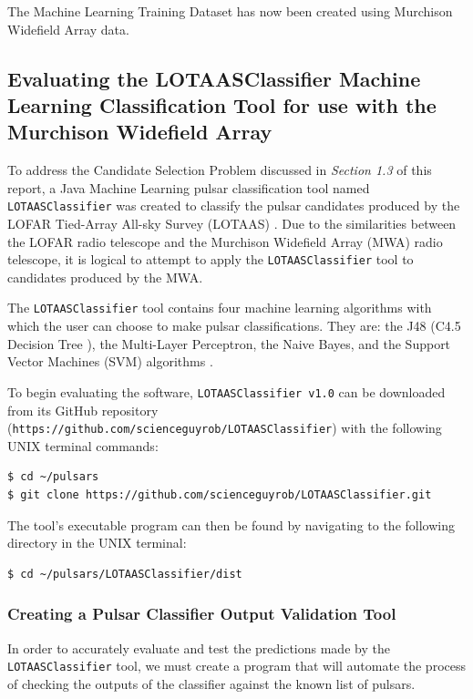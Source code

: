 \documentclass{article}
\begin{document}
The Machine Learning Training Dataset has now been created using Murchison Widefield Array data.
    
\subsection{Evaluating the LOTAASClassifier Machine Learning Classification Tool for use with the Murchison Widefield Array}

To address the Candidate Selection Problem discussed in \emph{Section 1.3} of this report, a Java Machine Learning pulsar classification tool named \verb|LOTAASClassifier| was created to classify the pulsar candidates produced by the LOFAR Tied-Array All-sky Survey (LOTAAS) \autocite{lyon}. Due to the similarities between the LOFAR radio telescope and the Murchison Widefield Array (MWA) radio telescope, it is logical to attempt to apply the \verb|LOTAASClassifier| tool to candidates produced by the MWA.

The \verb|LOTAASClassifier| tool contains four machine learning algorithms with which the user can choose to make pulsar classifications. They are: the J48 (C4.5 Decision Tree \autocite{quinlan}), the Multi-Layer Perceptron, the Naive Bayes, and the Support Vector Machines (SVM) algorithms \autocite{lyon}.

To begin evaluating the software, \verb|LOTAASClassifier v1.0| can be downloaded from its GitHub repository \\(\verb|https://github.com/scienceguyrob/LOTAASClassifier|) with the following UNIX terminal commands:

\begin{lstlisting}[numbers=none]
$ cd ~/pulsars
$ git clone https://github.com/scienceguyrob/LOTAASClassifier.git
\end{lstlisting}

The tool's executable program can then be found by navigating to the following directory in the UNIX terminal:

\begin{lstlisting}[numbers=none]
$ cd ~/pulsars/LOTAASClassifier/dist
\end{lstlisting}

\subsubsection{Creating a Pulsar Classifier Output Validation Tool}

In order to accurately evaluate and test the predictions made by the \verb|LOTAASClassifier| tool, we must create a program that will automate the process of checking the outputs of the classifier against the known list of pulsars.
\end{document}
